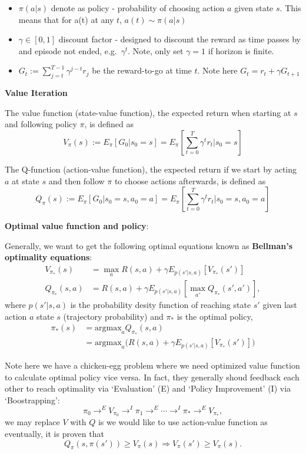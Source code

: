\documentclass[11pt]{article}
\begin{document}
\begin{itemize}
\item
  \(\pi(a|s)\) denote as policy - probability of choosing action \(a\)
  given state \(s\). This means that for a(t) at any \(t\),
  \(a(t) \sim \pi(a|s)\)
\item
  \(\gamma \in [0,1]\) discount factor - designed to discount the reward
  as time passes by and episode not ended, e.g.~\(\gamma^t\). Note, only
  set \(\gamma = 1\) if horizon is finite.
\item
  \(G_t := \sum_{j=t}^{T-1} \gamma^{j-t} r_j\) be the reward-to-go at
  time \(t\). Note here \(G_t = r_t + \gamma G_{t+1}\)
\end{itemize}

\textbf{Value Iteration}

The value function (state-value function), the expected return when
starting at \(s\) and following policy \(\pi\), is defined as \[
 V_\pi (s) := E_\pi [G_0|s_0 = s] = E_\pi \left[\sum_{t=0}^{T} \gamma^{t} r_t\bigg|s_0=s\right]
\]

The Q-function (action-value function), the expected return if we start
by acting \(a\) at state \(s\) and then follow \(\pi\) to choose actions
afterwards, is defined as \[
 Q_\pi (s) := E_\pi [G_0|s_0 = s, a_0 = a] = E_\pi \left[\sum_{t=0}^{T} \gamma^{t} r_t\bigg|s_0=s, a_0 =a\right]
\]

    \textbf{Optimal value function and policy}:

Generally, we want to get the following optimal equations known as
{\textbf{Bellman's optimality equations}}: \[
\begin{aligned}
V_{\pi_*}(s) & = \max_a R(s,a) + \gamma E_{p(s'|s,a)} [V_{\pi_*}(s')]
\\
Q_{\pi_*}(s,a) & = R(s,a) + \gamma E_{p(s'|s,a)} [\max_{a'} Q_{\pi_*}(s',a')],
\end{aligned}
\] where \(p(s'|s,a)\) is the probability desity function of reaching
state \(s'\) given last action \(a\) state \(s\) (trajectory
probability) and \(\pi_*\) is the optimal policy, \[
\begin{aligned}
{\pi_*}(s) & = \text{argmax}_a Q_{\pi_*}(s,a)
\\
& =  \text{argmax}_a  \bigg(R(s,a) + \gamma E_{p(s'|s,a)} [V_{\pi_*}(s')]\bigg)
\end{aligned}
\]

Note here we have a chicken-egg problem where we need optimized value
function to calculate optimal policy vice versa. In fact, they generally
shoud feedback each other to reach optimality via `Evaluation' (E) and
`Policy Improvement' (I) via `Boostrapping': \[
\pi_0 \rightarrow^E V_{\pi_0}  \rightarrow^I \pi_1 \rightarrow^E \cdots \rightarrow^I \pi_* \rightarrow^E V_{\pi_*},
\] we may replace \(V\) with \(Q\) is we would like to use action-value
function as eventually, it is proven that \[
Q_\pi(s,\pi(s')) \geqslant V_\pi(s) \Rightarrow V_\pi(s') \geqslant V_\pi(s).
\]
\end{document}
